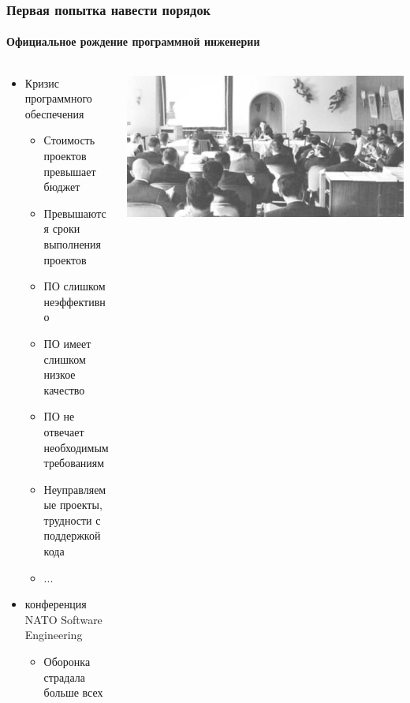 \documentclass{../../slides-style}
\begin{document}
    \begin{frame}
        \frametitle{Первая попытка навести порядок}
        \framesubtitle{Официальное рождение программной инженерии}
        \begin{columns}
            \begin{column}{0.7\textwidth}
                \begin{itemize}
                    \item Кризис программного обеспечения
                    \begin{itemize}
                        \item Стоимость проектов превышает бюджет
                        \item Превышаются сроки выполнения проектов
                        \item ПО слишком неэффективно
                        \item ПО имеет слишком низкое качество
                        \item ПО не отвечает необходимым требованиям
                        \item Неуправляемые проекты, трудности с поддержкой кода
                        \item ...
                    \end{itemize}
                    \item конференция NATO Software Engineering
                    \begin{itemize}
                        \item Оборонка страдала больше всех
                    \end{itemize}
                \end{itemize}
            \end{column}
            \begin{column}{0.3\textwidth}
                \begin{center}
                    \includegraphics[width=\textwidth]{natoConference.png}
                \end{center}
            \end{column}
        \end{columns}
    \end{frame}
\end{document}

